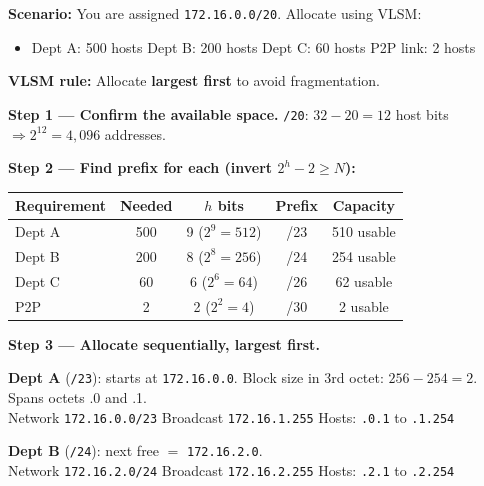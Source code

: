 \documentclass[11pt, letterpaper]{article}
\begin{document}
\vspace{8pt}

\begin{tcolorbox}[colback=partbg, colframe=sectionblue,
  title={\bfseries Problem B3 --- VLSM: Carve One Block for Multiple Departments}, arc=3pt, boxrule=1pt]
\textbf{Scenario:} You are assigned \texttt{172.16.0.0/20}. Allocate using VLSM:
\begin{itemize}[noitemsep]
  \item Dept A: 500 hosts \quad Dept B: 200 hosts \quad Dept C: 60 hosts \quad P2P link: 2 hosts
\end{itemize}
\textbf{VLSM rule:} Allocate \textbf{largest first} to avoid fragmentation.
\end{tcolorbox}

\textbf{Step 1 --- Confirm the available space.}
\texttt{/20}: $32-20=12$ host bits $\Rightarrow 2^{12} = 4{,}096$ addresses.

\textbf{Step 2 --- Find prefix for each (invert $2^h-2 \geq N$):}
\begin{center}
\renewcommand{\arraystretch}{1.2}
\begin{tabular}{lcccc}
\toprule
\textbf{Requirement} & \textbf{Needed} & \textbf{$h$ bits} & \textbf{Prefix} & \textbf{Capacity} \\
\midrule
Dept A & 500 & 9 ($2^9=512$) & /23 & 510 usable \\
Dept B & 200 & 8 ($2^8=256$) & /24 & 254 usable \\
Dept C & 60  & 6 ($2^6=64$)  & /26 & 62 usable  \\
P2P    & 2   & 2 ($2^2=4$)   & /30 & 2 usable   \\
\bottomrule
\end{tabular}
\end{center}

\textbf{Step 3 --- Allocate sequentially, largest first.}

\textbf{Dept A} (\texttt{/23}): starts at \texttt{172.16.0.0}. Block size in 3rd octet:
$256 - 254 = 2$. Spans octets .0 and .1.\\
Network \texttt{172.16.0.0/23} \quad Broadcast \texttt{172.16.1.255} \quad Hosts: \texttt{.0.1} to \texttt{.1.254}

\textbf{Dept B} (\texttt{/24}): next free $= $ \texttt{172.16.2.0}.\\
Network \texttt{172.16.2.0/24} \quad Broadcast \texttt{172.16.2.255} \quad Hosts: \texttt{.2.1} to \texttt{.2.254}
\end{document}
